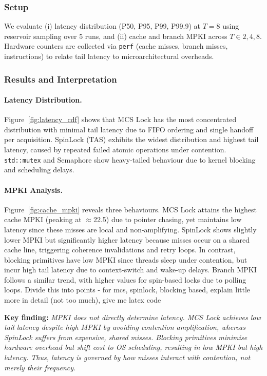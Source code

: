 \documentclass[conference]{IEEEtran}
\begin{document}
\subsubsection{Setup}
We evaluate (i) latency distribution (P50, P95, P99, P99.9) at $T=8$ using reservoir sampling over 5 runs, and (ii) cache and branch MPKI across $T\in{2,4,8}$. Hardware counters are collected via \texttt{perf} (cache misses, branch misses, instructions) to relate tail latency to microarchitectural overheads.

\subsubsection{Results and Interpretation}

\paragraph{Latency Distribution.}
Figure~\ref{fig:latency_cdf} shows that MCS Lock has the most concentrated distribution with minimal tail latency due to FIFO ordering and single handoff per acquisition. SpinLock (TAS) exhibits the widest distribution and highest tail latency, caused by repeated failed atomic operations under contention. \texttt{std::mutex} and Semaphore show heavy-tailed behaviour due to kernel blocking and scheduling delays.

\paragraph{MPKI Analysis.}
Figure~\ref{fig:cache_mpki} reveals three behaviours. MCS Lock attains the highest cache MPKI (peaking at $\approx$22.5) due to pointer chasing, yet maintains low latency since these misses are local and non-amplifying. SpinLock shows slightly lower MPKI but significantly higher latency because misses occur on a shared cache line, triggering coherence invalidations and retry loops. In contrast, blocking primitives have low MPKI since threads sleep under contention, but incur high tail latency due to context-switch and wake-up delays. Branch MPKI follows a similar trend, with higher values for spin-based locks due to polling loops. Divide this into points - for mcs, spinlock, blocking based, explain little more in detail (not too much), give me latex code

\textbf{Key finding:} \emph{MPKI does not directly determine latency. MCS Lock achieves low tail latency despite high MPKI by avoiding contention amplification, whereas SpinLock suffers from expensive, shared misses. Blocking primitives minimise hardware overhead but shift cost to OS scheduling, resulting in low MPKI but high latency. Thus, latency is governed by how misses interact with contention, not merely their frequency.}
\end{document}
